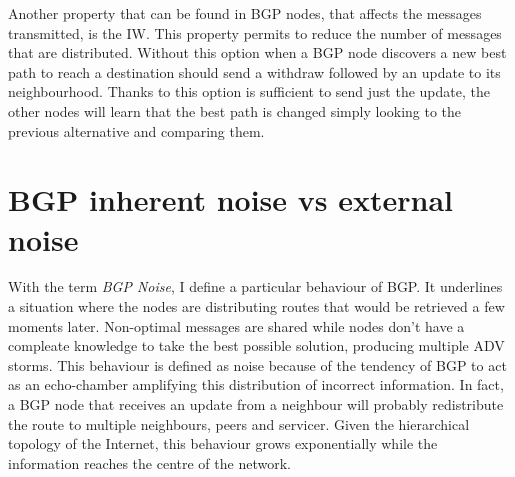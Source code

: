 Another property that can be found in \ac{BGP} nodes, that affects the messages
transmitted, is the \ac{IW}.
This property permits to reduce the number of messages that are distributed.
Without this option when a \ac{BGP} node discovers a new best path to reach
a destination should send a withdraw followed by an update to its neighbourhood.
Thanks to this option is sufficient to send just the update, the other nodes
will learn that the best path is changed simply looking to the previous
alternative and comparing them.


%

\section{BGP inherent noise vs external noise}
\label{sec:bgp_noise}

With the term \textit{BGP Noise}, I define a particular behaviour
of \ac{BGP}.
It underlines a situation where the nodes are distributing routes
that would be retrieved a few moments later.
Non-optimal messages are shared while nodes don't have a compleate knowledge
to take the best possible solution, producing multiple \ac{ADV} storms.
This behaviour is defined as noise because of the tendency of \ac{BGP} to act
as an echo-chamber amplifying this distribution of incorrect information.
In fact, a \ac{BGP} node that receives an update from a neighbour will probably
redistribute the route to multiple neighbours, peers and servicer.
Given the hierarchical topology of the Internet, this behaviour grows
exponentially while the information reaches the centre of the network.

